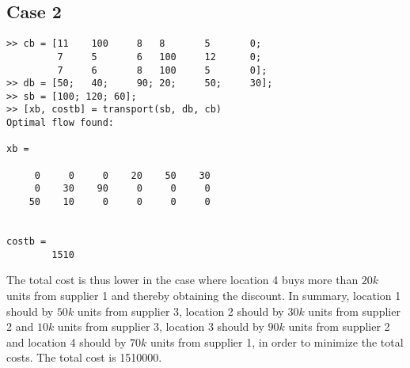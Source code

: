 \documentclass{article}
\begin{document}
  \subsection*{Case 2}
  \begin{lstlisting}
>> cb = [11    100     8   8       5       0;
         7     5       6   100     12      0;
         7     6       8   100     5       0];
>> db = [50;   40;     90; 20;     50;     30];
>> sb = [100; 120; 60];
>> [xb, costb] = transport(sb, db, cb)
Optimal flow found:

xb =

     0     0     0    20    50    30
     0    30    90     0     0     0
    50    10     0     0     0     0


costb =
        1510
  \end{lstlisting}

  \noindent
  The total cost is thus lower in the case where location 4 buys more than
  $20k$ units from supplier 1 and thereby obtaining the discount. In summary,
  location 1 should by $50k$ units from supplier 3, location 2 should by $30k$
  units from supplier 2 and $10k$ units from supplier 3, location 3 should by
  $90k$ units from supplier 2 and location 4 should by $70k$ units from
  supplier 1, in order to minimize the total costs. The total cost is 1510000.
\end{document}
